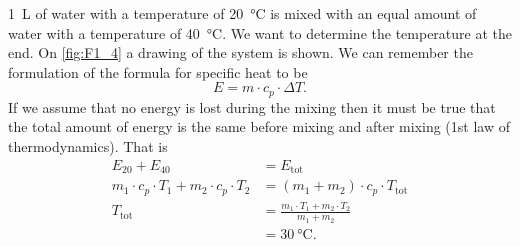 \begin{eks} 
  \qty{1}{L} of water with a temperature of \qty{20}{\celsius} is mixed with an equal amount of water with a temperature of \qty{40}{\celsius}. We want to determine the temperature at the end.
  \bigbreak
  On \autoref{fig:F1_4} a drawing of the system is shown. We can remember the formulation of the formula for specific heat to be
  \[ 
  E = m \cdot c_p \cdot \Delta T
  .\]
  If we assume that no energy is lost during the mixing then it must be true that the total amount of energy is the same before mixing and after mixing (1st law of thermodynamics). That is
  \begin{align*}
    E_{20} + E_{40} &= E_{\mathrm{tot}} \\
    m_1 \cdot c_{p} \cdot T_1 + m_2 \cdot c_{p} \cdot T_2 &= \left( m_1 + m_2 \right) \cdot c_p \cdot T_{\mathrm{tot}} \\
    T_{\mathrm{tot}} &= \frac{m_1 \cdot T_1 + m_2 \cdot T_2}{m_1 + m_2} \\
    &= \qty{30}{\celsius}
  .\end{align*}
\end{eks}



